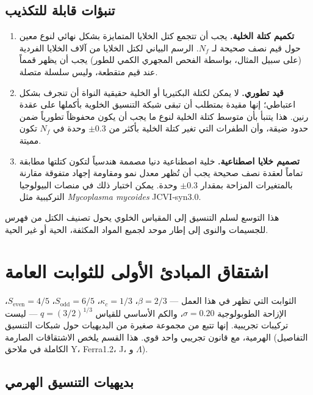 \documentclass[11pt,a4paper]{article}
\begin{document}
	\subsection{تنبؤات قابلة للتكذيب}
	\begin{enumerate}
		\item \textbf{تكميم كتلة الخلية.} يجب أن تتجمع كتل الخلايا المتمايزة بشكل نهائي لنوع معين حول قيم نصف صحيحة لـ \(N_f\). الرسم البياني لكتل الخلايا من آلاف الخلايا الفردية (على سبيل المثال، بواسطة الفحص المجهري الكمي للطور) يجب أن يظهر قمماً عند قيم متقطعة، وليس سلسلة متصلة.
		\item \textbf{قيد تطوري.} لا يمكن لكتلة البكتيريا أو الخلية حقيقية النواة أن تنجرف بشكل اعتباطي؛ إنها مقيدة بمتطلب أن تبقى شبكة التنسيق الخلوية بأكملها على عقدة رنين. هذا يتنبأ بأن متوسط كتلة الخلية لنوع ما يجب أن يكون محفوظاً تطورياً ضمن حدود ضيقة، وأن الطفرات التي تغير كتلة الخلية بأكثر من \(\pm 0.3\) وحدة في \(N_f\) تكون مميتة.
		\item \textbf{تصميم خلايا اصطناعية.} خلية اصطناعية دنيا مصممة هندسياً لتكون كتلتها مطابقة تماماً لعقدة نصف صحيحة يجب أن تُظهر معدل نمو ومقاومة إجهاد متفوقة مقارنة بالمتغيرات المزاحة بمقدار \(\pm 0.3\) وحدة. يمكن اختبار ذلك في منصات البيولوجيا التركيبية مثل \textit{Mycoplasma mycoides} JCVI‑syn3.0.
	\end{enumerate}
	
	هذا التوسع لسلم التنسيق إلى المقياس الخلوي يحول تصنيف الكتل من فهرس للجسيمات والنوى إلى إطار موحد لجميع المواد المكثفة، الحية أو غير الحية.
	
	\section{اشتقاق المبادئ الأولى للثوابت العامة}
	\label{sec:first-principles}
	
	الثوابت التي تظهر في هذا العمل — \(\beta = 2/3\)، \(\kappa_c = 1/3\)، \(S_{\mathrm{odd}}=6/5\)، \(S_{\mathrm{even}}=4/5\)، الإزاحة الطوبولوجية \(\sigma = 0.20\)، والكم الأساسي للقياس \(q = (3/2)^{1/3}\) — ليست تركيبات تجريبية. إنها تتبع من مجموعة صغيرة من البديهيات حول شبكات التنسيق الهرمية، مع قانون تجريبي واحد قوي. هذا القسم يلخص الاشتقاقات الصارمة (التفاصيل الكاملة في ملاحق Y، Ferra1.2، J، و \(\Lambda\)).
	
	\subsection{بديهيات التنسيق الهرمي}
	
\end{document}
